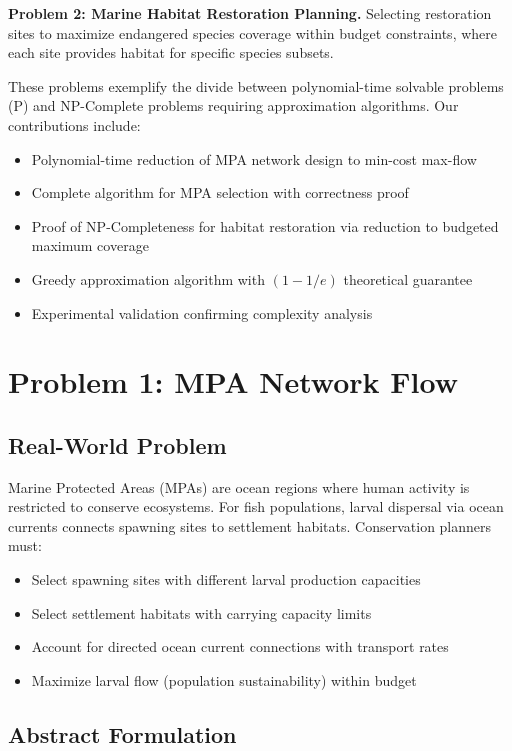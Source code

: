 \documentclass[sigconf,nonacm]{acmart}
\begin{document}
\textbf{Problem 2: Marine Habitat Restoration Planning.} Selecting restoration sites to maximize endangered species coverage within budget constraints, where each site provides habitat for specific species subsets.

These problems exemplify the divide between polynomial-time solvable problems (P) and NP-Complete problems requiring approximation algorithms. Our contributions include:

\begin{itemize}
    \item Polynomial-time reduction of MPA network design to min-cost max-flow
    \item Complete algorithm for MPA selection with correctness proof
    \item Proof of NP-Completeness for habitat restoration via reduction to budgeted maximum coverage
    \item Greedy approximation algorithm with $(1-1/e)$ theoretical guarantee
    \item Experimental validation confirming complexity analysis
\end{itemize}

\section{Problem 1: MPA Network Flow}

\subsection{Real-World Problem}

Marine Protected Areas (MPAs) are ocean regions where human activity is restricted to conserve ecosystems. For fish populations, larval dispersal via ocean currents connects spawning sites to settlement habitats. Conservation planners must:

\begin{itemize}
    \item Select spawning sites with different larval production capacities
    \item Select settlement habitats with carrying capacity limits
    \item Account for directed ocean current connections with transport rates
    \item Maximize larval flow (population sustainability) within budget
\end{itemize}

\subsection{Abstract Formulation}
\end{document}
